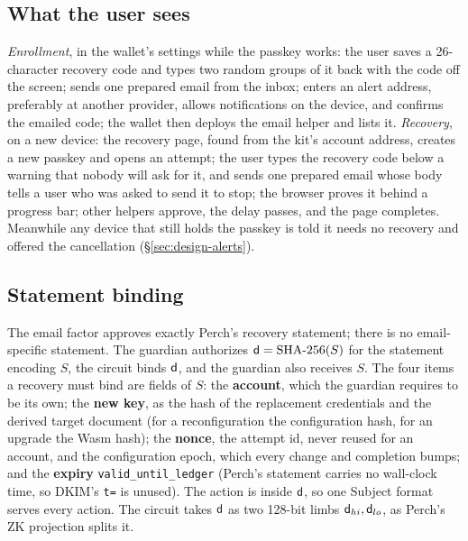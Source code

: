 \subsection{What the user sees}\label{sec:design-ux}
\emph{Enrollment}, in the wallet's settings while the passkey works: the
user saves a 26-character recovery code and types two random groups of it
back with the code off the screen; sends one prepared email from the inbox;
enters an alert address, preferably at another provider, allows
notifications on the device, and confirms the emailed code; the wallet then
deploys the email helper and lists it. \emph{Recovery}, on a new device: the
recovery page, found from the kit's account address, creates a new passkey
and opens an attempt; the user types the recovery code below a warning that
nobody will ask for it, and sends one prepared email whose body tells a user
who was asked to send it to stop; the browser proves it behind a progress
bar; other helpers approve, the delay passes, and the page
completes. Meanwhile any device
that still holds the passkey is told it needs no recovery and offered the
cancellation (\S\ref{sec:design-alerts}).

\subsection{Statement binding}\label{sec:design-statement}
The email factor approves exactly Perch's recovery statement; there is no
email-specific statement. The guardian authorizes $\mathsf{d} = \mathrm{SHA\text{-}256}(S)$ for
the statement encoding $S$, the circuit binds $\mathsf{d}$, and the guardian
also receives $S$. The four items a recovery must bind are fields of $S$:
the \textbf{account}, which the guardian requires to be its own; the
\textbf{new key}, as the hash of the replacement credentials and the derived
target document (for a reconfiguration the configuration hash, for an
upgrade the Wasm hash); the \textbf{nonce}, the attempt id, never reused for
an account, and the configuration epoch, which every change and completion
bumps; and the \textbf{expiry} \texttt{valid\_until\_ledger} (Perch's
statement carries no wall-clock time, so DKIM's \texttt{t=} is unused). The
action is inside $\mathsf{d}$, so one Subject format serves every action. The
circuit takes $\mathsf{d}$ as two 128-bit limbs $\mathsf{d}_{hi}, \mathsf{d}_{lo}$,
as Perch's ZK projection splits it.

